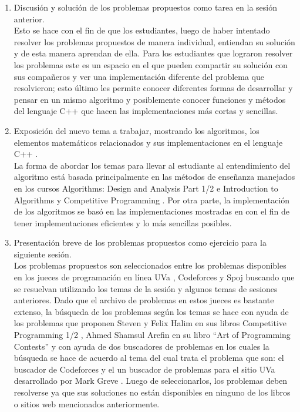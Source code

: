 \documentclass[conference]{IEEEtran}
\begin{document}
	\begin{enumerate}
		\item Discusión y solución de los problemas propuestos como tarea en la sesión anterior.\\Esto se hace con el fin de que los estudiantes, luego de haber intentado resolver los problemas propuestos de manera individual, entiendan su solución y de esta manera aprendan de ella. Para los estudiantes que lograron resolver los problemas este es un espacio en el que pueden compartir su solución con sus compañeros y ver una implementación diferente del problema que resolvieron; esto último les permite conocer diferentes formas de desarrollar y pensar en un mismo algoritmo y posiblemente conocer funciones y métodos del lenguaje C++ que hacen las implementaciones más cortas y sencillas.
		\item Exposición del nuevo tema a trabajar, mostrando los algoritmos, los elementos matemáticos relacionados y sus implementaciones en el lenguaje C++ \cite{C++}.\\La forma de abordar los temas para llevar al estudiante al entendimiento del algoritmo está basada principalmente en las métodos de enseñanza manejados en los cursos Algorithms: Design and Analysis Part 1/2 \cite{Coursera1, Coursera2} e Introduction to Algorithms \cite{CourseMIT} y Competitive Programming \cite{CourseNUS}. Por otra parte, la implementación de los algoritmos se basó en las implementaciones mostradas en \cite{Halim, Halim2, ArtOfProgramming} con el fin de tener implementaciones eficientes y lo más sencillas posibles.
		\item Presentación breve de los problemas propuestos como ejercicio para la siguiente sesión.\\Los problemas propuestos son seleccionados entre los problemas disponibles en los jueces de programación en línea UVa \cite{UVa}, Codeforces \cite{Codeforces} y Spoj\cite{Spoj} buscando que se resuelvan utilizando los temas de la sesión y algunos temas de sesiones anteriores. Dado que el archivo de problemas en estos jueces es bastante extenso, la búsqueda de los problemas según los temas se hace con ayuda de los problemas que proponen Steven y Felix Halim en sus libros Competitive Programming 1/2 \cite{Halim, Halim2}, Ahmed Shamsul Arefin en su libro ``Art of Programming Contests''\cite{ArtOfProgramming} y con ayuda de dos buscadores de problemas en los cuales la búsqueda se hace de acuerdo al tema del cual trata el problema que son: el buscador de Codeforces y el un buscador de problemas para el sitio UVa desarrollado por Mark Greve \cite{UVAToolkit}. Luego de seleccionarlos, los problemas deben resolverse ya que sus soluciones no están disponibles en ninguno de los libros o sitios web mencionados anteriormente.
	\end{enumerate}
\end{document}
